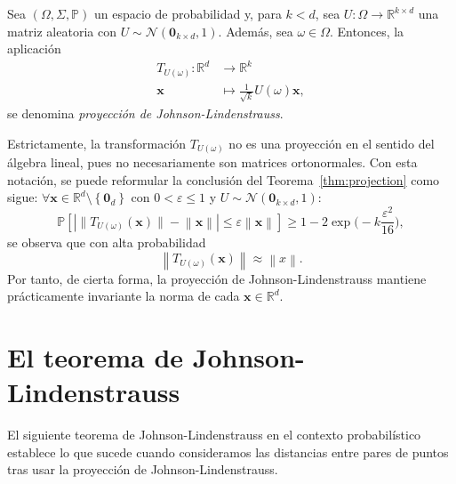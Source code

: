 \begin{definition}
	Sea $\left(\Omega,\Sigma,\mathbb{P}\right)$ un espacio de
	probabilidad y, para $k<d$, sea
	$U\colon\Omega\to\mathbb{R}^{k\times d}$ una matriz aleatoria con
	$U\sim\mathcal{N}\left(\symbf{0}_{k\times d},1\right)$.
	Además, sea $\omega\in\Omega$.
	Entonces, la aplicación
	\begin{equation}\label{eq:projection}
		\begin{aligned}
			T_{U\left(\omega\right)}\colon\mathbb{R}^{d} & \longrightarrow
			\mathbb{R}^{k}                                                 \\
			\symbf{x}                                    & \longmapsto
			\frac{1}{\sqrt{k}}
			U\left(\omega\right)\symbf{x},
		\end{aligned}
	\end{equation}
	se denomina \emph{proyección de Johnson-Lindenstrauss}.
\end{definition}
Estrictamente, la transformación $T_{U\left(\omega\right)}$ no es una
proyección en el sentido del álgebra lineal, pues no necesariamente
son matrices ortonormales.
Con esta notación, se puede reformular la conclusión del
Teorema~\ref{thm:projection} como sigue:
\begin{math}
	\forall\symbf{x}\in\mathbb{R}^{d}\setminus
	\left\{\symbf{0}_{d}\right\}
\end{math}
con $0<\varepsilon\leq 1$ y
$U\sim\mathcal{N}\left(\symbf{0}_{k\times d},1\right)$:
\begin{equation}
	\mathbb{P}
	\left[
		\left|
		\big\|T_{U\left(\omega\right)}\left(\symbf{x}\right)\big\|-
		\left\|\symbf{x}\right\|
		\right|\leq
		\varepsilon\left\|\symbf{x}\right\|
		\right]
	\geq 1-
	2\exp
	\Big(
	-k\frac{\varepsilon^{2}}{16}
	\Big),
\end{equation}
se observa que con alta probabilidad
\begin{equation*}
	\left\|
	T_{U\left(\omega\right)}\left(\symbf{x}\right)
	\right\|
	\approx
	\left\|x\right\|.
\end{equation*}
Por tanto, de cierta forma, la proyección de Johnson-Lindenstrauss
mantiene prácticamente invariante la norma de cada
$\symbf{x}\in\mathbb{R}^{d}$.

\section{El teorema de Johnson-Lindenstrauss}

El siguiente teorema de Johnson-Lindenstrauss en el contexto
probabilístico establece lo que sucede cuando consideramos
las distancias entre pares de puntos tras usar la proyección de
Johnson-Lindenstrauss.

